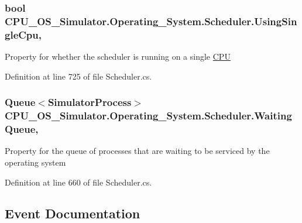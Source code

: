 \subsubsection[{Using\+Single\+Cpu}]{\setlength{\rightskip}{0pt plus 5cm}bool C\+P\+U\+\_\+\+O\+S\+\_\+\+Simulator.\+Operating\+\_\+\+System.\+Scheduler.\+Using\+Single\+Cpu\hspace{0.3cm}{\ttfamily [get]}, {\ttfamily [set]}}\label{class_c_p_u___o_s___simulator_1_1_operating___system_1_1_scheduler_a3637999160bc25da430731042f42dd81}


Property for whether the scheduler is running on a single \hyperlink{namespace_c_p_u___o_s___simulator_1_1_c_p_u}{C\+P\+U} 



Definition at line 725 of file Scheduler.\+cs.

\hypertarget{class_c_p_u___o_s___simulator_1_1_operating___system_1_1_scheduler_aac41827d1eff5710d0a9b5ea664dd99f}{}
\subsubsection[{Waiting\+Queue}]{\setlength{\rightskip}{0pt plus 5cm}Queue$<${\bf Simulator\+Process}$>$ C\+P\+U\+\_\+\+O\+S\+\_\+\+Simulator.\+Operating\+\_\+\+System.\+Scheduler.\+Waiting\+Queue\hspace{0.3cm}{\ttfamily [get]}, {\ttfamily [set]}}\label{class_c_p_u___o_s___simulator_1_1_operating___system_1_1_scheduler_aac41827d1eff5710d0a9b5ea664dd99f}


Property for the queue of processes that are waiting to be serviced by the operating system 



Definition at line 660 of file Scheduler.\+cs.



\subsection{Event Documentation}
\hypertarget{class_c_p_u___o_s___simulator_1_1_operating___system_1_1_scheduler_a13cc271f1cf9b76d1cbc87988c45e1fb}{}
